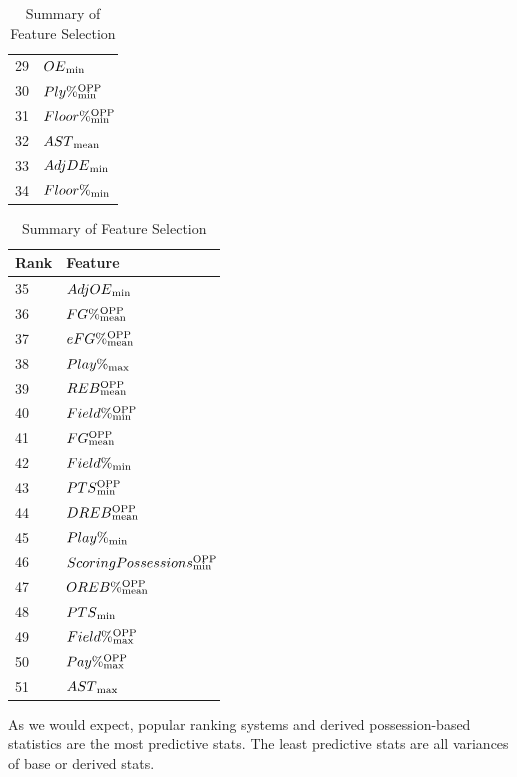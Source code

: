 \documentclass[]{article}
\def\SPSB#1#2{\rlap{\textsuperscript{#1}}\SB{#2}}
\def\SB#1{\textsubscript{{#1}}}
\begin{document}
\begin{table}[ht]
\begin{tabular}{@{}ll@{}}
29 & $OE\SB{min}$       \\
30 & $Ply\%\SPSB{OPP}{min}$                \\
31 & $Floor\%\SPSB{OPP}{min}$               \\
32 & $AST\SB{mean}$                        \\
33 & $AdjDE\SB{min}$  \\
34 & $Floor\%\SB{min}$                  \\
\bottomrule
\end{tabular}
\hspace{1em}
\begin{tabular}{@{}ll@{}}
\toprule
Rank & Feature							   \\ \midrule
35 & $AdjOE\SB{min}$  \\
36 & $FG\%\SPSB{OPP}{mean}$                 \\
37 & $eFG\%\SPSB{OPP}{mean}$      \\
38 & $Play\%\SB{max}$                   \\
39 & $REB\SPSB{OPP}{mean}$                     \\
40 & $Field\%\SPSB{OPP}{min}$               \\
41 & $FG\SPSB{OPP}{mean}$                      \\
42 & $Field\%\SB{min}$                  \\
43 & $PTS\SPSB{OPP}{min}$                      \\
44 & $DREB\SPSB{OPP}{mean}$                \\
45 & $Play\%\SB{min}$                   \\
46 & $Scoring Possessions\SPSB{OPP}{min}$     \\
47 & $OREB\%\SPSB{OPP}{mean}$     \\
48 & $PTS\SB{min}$                         \\
49 & $Field\%\SPSB{OPP}{max}$               \\
50 & $Pay\%\SPSB{OPP}{max}$                \\ 
51 & $AST\SB{max}$                \\ \bottomrule
\end{tabular}
\caption{Summary of Feature Selection}
\label{table:feature_selection}
\end{table}

As we would expect, popular ranking systems and derived possession-based statistics are the most predictive stats. The least predictive stats are all variances of base or derived stats.
\end{document}
